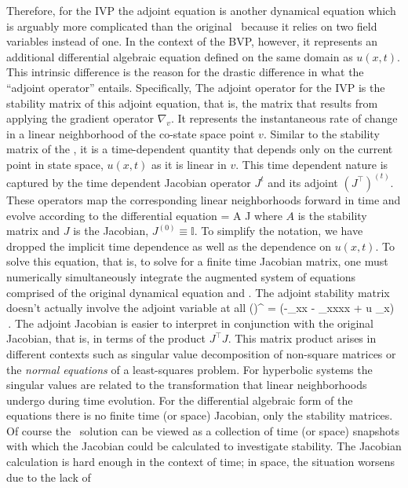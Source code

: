 Therefore, for the IVP the adjoint equation is another dynamical equation which is arguably
more complicated than the original \KSe\ because it relies on two field variables instead
of one. In the context of the BVP, however, it represents an additional differential algebraic
equation defined on the same domain as $u(x,t)$. This intrinsic difference is the reason
for the drastic difference in what the ``adjoint operator'' entails. Specifically,
The adjoint operator for the IVP is the stability matrix of this adjoint
equation, that is, the matrix that results from applying the
gradient operator $\nabla_v$.
It represents the instantaneous rate of change in a linear neighborhood
of the co-state space point $v$.  Similar to the stability matrix of the
\KSe, it is a time-dependent quantity that depends only on the current point in
state space, $u(x,t)$ as it is linear in $v$. This time dependent nature is
captured by the time dependent Jacobian operator $J^t$ and its adjoint $(J^{\top})^(t)$.
These operators map the corresponding linear neighborhoods forward in time
and evolve according to the differential equation
\beq \label{jacobiandot}
 = A J
\eeq
where $A$ is the stability matrix and $J$ is the Jacobian, $J^(0) \equiv \mathbb{I}$.
To simplify the notation, we have dropped the implicit time dependence as well as the
dependence on $u(x,t)$. To solve this equation, that is, to solve for a finite time Jacobian
matrix, one must numerically simultaneously integrate the augmented system of equations comprised
of the original dynamical equation and . The adjoint stability matrix
doesn't actually involve the adjoint variable at all
\beq \label{adjstab}
()^{\top} = (-\partial_{xx} - \partial_{xxxx} + u \partial_x) \,.
\eeq
The adjoint Jacobian is easier to interpret in conjunction with the original Jacobian,
that is, in terms of the product $J^{\top}J$. This matrix product
arises in different contexts such as singular value decomposition of non-square
matrices or the \textit{normal equations} of a least-squares problem.
For hyperbolic systems the singular values are related to the transformation that
linear neighborhoods undergo during time evolution.
For the differential algebraic form of the equations there is no finite time (or space)
Jacobian, only the stability matrices.
Of course the \spt\ solution can
be viewed as a collection of time (or space) snapshots with which the Jacobian could
be calculated to investigate stability. The Jacobian calculation is hard enough in the
context of time; in space, the situation worsens due to the lack of
